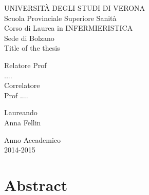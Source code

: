 \documentclass[12pt,a4paper,oneside]{book}
\begin{document}
\frontmatter

\def\title{Title of the thesis}
\def\author{Name of the student}
\def\advisor{Name of the supervisor}
\def\date{July, 2013}

\begin{titlepage}
\vspace{30pt}
\begin{center}
\Large UNIVERSIT\`A DEGLI STUDI DI VERONA\\Scuola Provinciale Superiore Sanit\`a\\\vspace{40pt}
Corso di Laurea in INFERMIERISTICA\\Sede di Bolzano\\\vspace{30pt} {\huge\title}\\\vspace{30pt}
\end{center}

\vspace{30pt}

\begin{flushleft}
Relatore
Prof \\....\\
\vspace{15pt}
Correlatore\\
Prof ....
\end{flushleft}

\vspace{15pt}

\begin{flushright}
Laureando\\
Anna Fellin
\end{flushright}

\vspace{30pt}

\begin{center} Anno Accademico \\ 2014-2015 \end{center}

\end{titlepage}

\tableofcontents

\mainmatter


\chapter*{Abstract}
\end{document}
